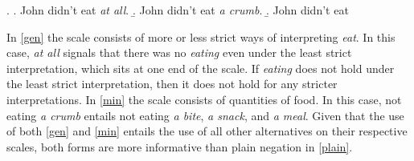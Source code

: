 \documentclass[linguex]{sp}
\theoremstyle{definition} \newtheorem{definition}{Definition}
\begin{document}
\ex. \label{all}	\a. John didn't eat \emph{at all}. \label{gen}
	\b. John didn't eat \emph{a crumb}. \label{min}
	\b. John didn't eat \label{plain}

In \ref{gen} the scale consists of more or less strict ways of interpreting \emph{eat}. In this case, \emph{at all} signals that there was no \emph{eating} even under the least strict interpretation, which sits at one end of the scale. If \emph{eating} does not hold under the least strict interpretation, then it does not hold for any stricter interpretations. In \ref{min} the scale consists of quantities of food. In this case, not eating \emph{a crumb} entails not eating \emph{a bite}, \emph{a snack}, and \emph{a meal}. Given that the use of both \ref{gen} and \ref{min} entails the use of all other alternatives on their respective scales, both forms are more informative than plain negation in \ref{plain}.
\end{document}
